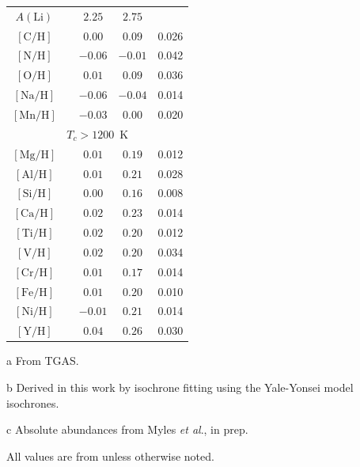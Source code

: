 \documentclass[12pt,letterpaper,margin=1in]{article}
\newcommand{\acronym}[1]{{\small{#1}}}
\newcommand{\tgas}{\acronym{TGAS}}
\newcommand{\etal}{\textit{et al}.}
\newcommand*\elem[1]{\ensuremath{\mathrm{#1}}}
\newcommand*\elemH[1]{\ensuremath{[\mathrm{#1}/\elem{H}]}}
\begin{document}
\begin{table}[htpb]
\begin{threeparttable}
\begin{tabular}{ccccc}
\hline 
$A(\elem{Li})$\tnote{c} &                & $2.25$                 & $2.75$                 &               \\
$\elemH{C}$             &                & $0.00$                 & $0.09$                 & 0.026         \\
$\elemH{N}$             &                & $-0.06$                & $-0.01$                & 0.042         \\
$\elemH{O}$             &                & $0.01$                 & $0.09$                 & 0.036         \\
$\elemH{Na}$            &                & $-0.06$                & $-0.04$                & 0.014         \\
$\elemH{Mn}$            &                & $-0.03$                & $0.00$                 & 0.020         \\
\hline 
\multicolumn{5}{c}{$T_c > 1200$~K} \\
\hline 
$\elemH{Mg}$            &                & $0.01$                 & $0.19$                 & 0.012         \\
$\elemH{Al}$            &                & $0.01$                 & $0.21$                 & 0.028         \\
$\elemH{Si}$            &                & $0.00$                 & $0.16$                 & 0.008         \\
$\elemH{Ca}$            &                & $0.02$                 & $0.23$                 & 0.014         \\
$\elemH{Ti}$            &                & $0.02$                 & $0.20$                 & 0.012         \\
$\elemH{V}$             &                & $0.02$                 & $0.20$                 & 0.034         \\
$\elemH{Cr}$            &                & $0.01$                 & $0.17$                 & 0.014         \\
$\elemH{Fe}$            &                & $0.01$                 & $0.20$                 & 0.010         \\
$\elemH{Ni}$            &                & $-0.01$                & $0.21$                 & 0.014         \\
$\elemH{Y}$             &                & $0.04$                 & $0.26$                 & 0.030         \\

\end{tabular}
\begin{tablenotes}
\item [a] From \tgas.
\item [b] Derived in this work by isochrone fitting using the Yale-Yonsei model
  isochrones\cite{2013ApJ...776...87S}.
\item [c] Absolute abundances from Myles \etal, in prep.
\item All values are from \citet{2016ApJS..225...32B} unless otherwise noted.
\end{tablenotes}
\end{threeparttable}
\end{table}
\end{document}

